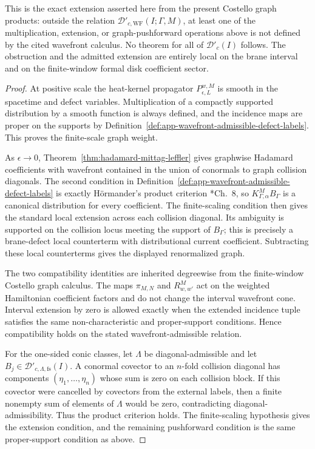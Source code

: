 \begin{prop}
  This is the exact extension asserted here from the present Costello
  graph products: outside the relation
  \(\mathcal D'_{c,\mathrm{WF}}(I;\Gamma,M)\), at least one of the
  multiplication, extension, or graph-pushforward operations above is not
  defined by the cited wavefront calculus.  No theorem for all of
  \(\mathcal D'_c(I)\) follows.  The obstruction and the admitted
  extension are entirely local on the brane interval and on the
  finite-window formal disk coefficient sector.
\end{prop}

\begin{proof}
  At positive scale the heat-kernel propagator
  \(P_{\epsilon,L}^{w,M}\) is smooth in the spacetime and defect
  variables.  Multiplication of a compactly supported distribution by a
  smooth function is always defined, and the incidence maps are proper on
  the supports by Definition~\ref{def:app-wavefront-admissible-defect-labels}.
  This proves the finite-scale graph weight.

  As \(\epsilon\to0\), Theorem~\ref{thm:hadamard-mittag-leffler} gives
  graphwise Hadamard coefficients with wavefront contained in the union of
  conormals to graph collision diagonals.  The second condition in
  Definition~\ref{def:app-wavefront-admissible-defect-labels} is exactly
  H\"ormander's product criterion
  \cite{hormander-vol1}*{Ch.~8}, so
  \(K^M_{\Gamma,\alpha}B_\Gamma\) is a canonical distribution for every
  coefficient.  The finite-scaling condition then gives the standard
  local extension across each collision diagonal.  Its ambiguity is
  supported on the collision locus meeting the support of \(B_\Gamma\);
  this is precisely a brane-defect local counterterm with distributional
  current coefficient.  Subtracting these local counterterms gives the
  displayed renormalized graph.

  The two compatibility identities are inherited degreewise from the
  finite-window Costello graph calculus.  The maps \(\pi_{M,N}\) and
  \(R^M_{w,w'}\) act on the weighted Hamiltonian coefficient factors and
  do not change the interval wavefront cone.  Interval extension by zero
  is allowed exactly when the extended incidence tuple satisfies the same
  non-characteristic and proper-support conditions.  Hence compatibility
  holds on the stated wavefront-admissible relation.

  For the one-sided conic classes, let
  \(\Lambda\) be diagonal-admissible and let
  \(B_j\in\mathcal D'_{c,\Lambda,\mathrm{fs}}(I)\).  A conormal covector
  to an \(n\)-fold collision diagonal has components
  \((\eta_1,\ldots,\eta_n)\) whose sum is zero on each collision block.
  If this covector were cancelled by covectors from the external labels,
  then a finite nonempty sum of elements of \(\Lambda\) would be zero,
  contradicting diagonal-admissibility.  Thus the product criterion holds.
  The finite-scaling hypothesis gives the extension condition, and the
  remaining pushforward condition is the same proper-support condition as
  above.


\end{proof}
